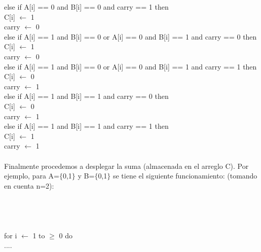 \documentclass[12pt,twoside]{article}
\begin{document}
\hspace*{2cm}else if A[i] == 0 and B[i] == 0 and carry == 1 then\\
\hspace*{3cm}C[i] $\leftarrow$ 1\\
\hspace*{3cm}carry $\leftarrow$ 0\\
\hspace*{2cm}else if A[i] == 1 and B[i] == 0  or A[i] == 0 and B[i] == 1 and carry ==  0 then\\
\hspace*{3cm}C[i] $\leftarrow$ 1\\
\hspace*{3cm}carry $\leftarrow$ 0\\
\hspace*{2cm}else if A[i] == 1 and B[i] == 0  or A[i] == 0 and B[i] == 1 and carry ==  1 then\\
\hspace*{3cm}C[i] $\leftarrow$ 0\\
\hspace*{3cm}carry $\leftarrow$ 1\\
\hspace*{2cm}else if A[i] == 1 and B[i] == 1 and carry == 0 then\\
\hspace*{3cm}C[i] $\leftarrow$ 0\\
\hspace*{3cm}carry $\leftarrow$ 1\\
\hspace*{2cm}else if A[i] == 1 and B[i] == 1 and carry == 1 then\\
\hspace*{3cm}C[i] $\leftarrow$ 1\\
\hspace*{3cm}carry $\leftarrow$ 1\\\\
Finalmente procedemos a desplegar la suma (almacenada en el arreglo C). Por ejemplo, para A=$\{$0,1$\}$ y B=$\{$0,1$\}$ se tiene el siguiente funcionamiento: (tomando en cuenta n=2):\\\\\\\\\\
\hspace*{1cm}for i $\leftarrow$ 1 to $\geq$ 0 do\\
\hspace*{2cm}....\\
\end{document}
